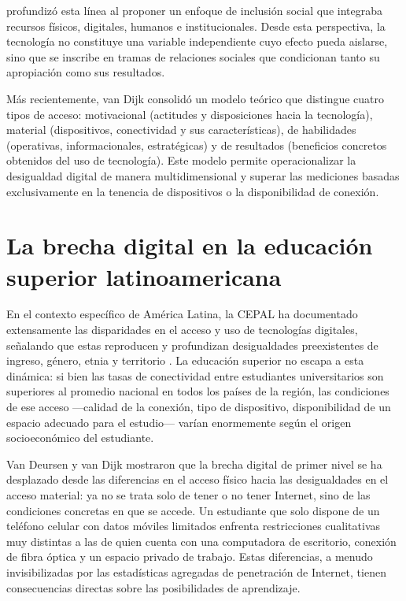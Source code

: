 \autocite{2562-WARSCHAUER2004} profundizó esta línea al proponer un enfoque de inclusión social que integraba recursos físicos, digitales, humanos e institucionales. Desde esta perspectiva, la tecnología no constituye una variable independiente cuyo efecto pueda aislarse, sino que se inscribe en tramas de relaciones sociales que condicionan tanto su apropiación como sus resultados.

Más recientemente, van Dijk \autocite*{2563-VANDIJK2020} consolidó un modelo teórico que distingue cuatro tipos de acceso: motivacional (actitudes y disposiciones hacia la tecnología), material (dispositivos, conectividad y sus características), de habilidades (operativas, informacionales, estratégicas) y de resultados (beneficios concretos obtenidos del uso de tecnología). Este modelo permite operacionalizar la desigualdad digital de manera multidimensional y superar las mediciones basadas exclusivamente en la tenencia de dispositivos o la disponibilidad de conexión.


\section{La brecha digital en la educación superior latinoamericana}
En el contexto específico de América Latina, la CEPAL ha documentado extensamente las disparidades en el acceso y uso de tecnologías digitales, señalando que estas reproducen y profundizan desigualdades preexistentes de ingreso, género, etnia y territorio \autocite{2566-CEPAL2021}. La educación superior no escapa a esta dinámica: si bien las tasas de conectividad entre estudiantes universitarios son superiores al promedio nacional en todos los países de la región, las condiciones de ese acceso —calidad de la conexión, tipo de dispositivo, disponibilidad de un espacio adecuado para el estudio— varían enormemente según el origen socioeconómico del estudiante.

Van Deursen y van Dijk \autocite*{2564-VANDEURSEN2019} mostraron que la brecha digital de primer nivel se ha desplazado desde las diferencias en el acceso físico hacia las desigualdades en el acceso material: ya no se trata solo de tener o no tener Internet, sino de las condiciones concretas en que se accede. Un estudiante que solo dispone de un teléfono celular con datos móviles limitados enfrenta restricciones cualitativas muy distintas a las de quien cuenta con una computadora de escritorio, conexión de fibra óptica y un espacio privado de trabajo. Estas diferencias, a menudo invisibilizadas por las estadísticas agregadas de penetración de Internet, tienen consecuencias directas sobre las posibilidades de aprendizaje.


